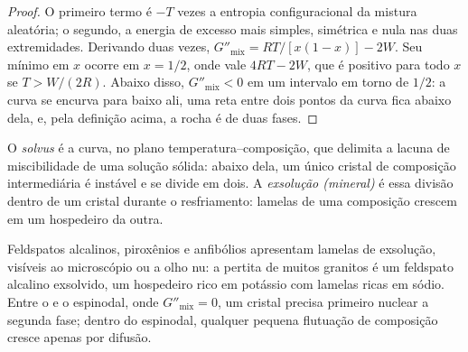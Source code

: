 \begin{proof}
O primeiro termo é $-T$ vezes a entropia configuracional da mistura aleatória;
o segundo, a energia de excesso mais simples, simétrica e nula nas duas extremidades.
Derivando duas vezes, $G''_{\text{mix}} = RT/[x(1 - x)] - 2W$. Seu mínimo
em $x$ ocorre em $x = 1/2$, onde vale $4RT - 2W$, que é positivo para
todo $x$ se $T > W/(2R)$. Abaixo disso, $G''_{\text{mix}} < 0$ em um intervalo
em torno de $1/2$: a curva se encurva para baixo ali, uma reta entre dois pontos
da curva fica abaixo dela, e, pela definição acima, a rocha é de duas
fases.
\end{proof}

\begin{definition}\label{def:b3:petrological-thermodynamics:solvus}
O \emph{solvus} é a curva, no plano temperatura--composição,
que delimita a lacuna de miscibilidade de uma solução sólida: abaixo dela, um
único cristal de composição intermediária é instável e se divide em dois.
A \emph{exsolução (mineral)} é essa divisão
dentro de um cristal durante o resfriamento: lamelas de uma composição crescem em um
hospedeiro da outra.
\end{definition}

Feldspatos alcalinos, piroxênios e anfibólios apresentam lamelas de exsolução,
visíveis ao microscópio ou a olho nu: a pertita de muitos granitos é
um feldspato alcalino exsolvido, um hospedeiro rico em potássio com
lamelas ricas em sódio. Entre o  e o espinodal, onde $G''_{\text{mix}} = 0$,
um cristal precisa primeiro nuclear a segunda fase; dentro do espinodal, qualquer
pequena flutuação de composição cresce apenas por difusão.

